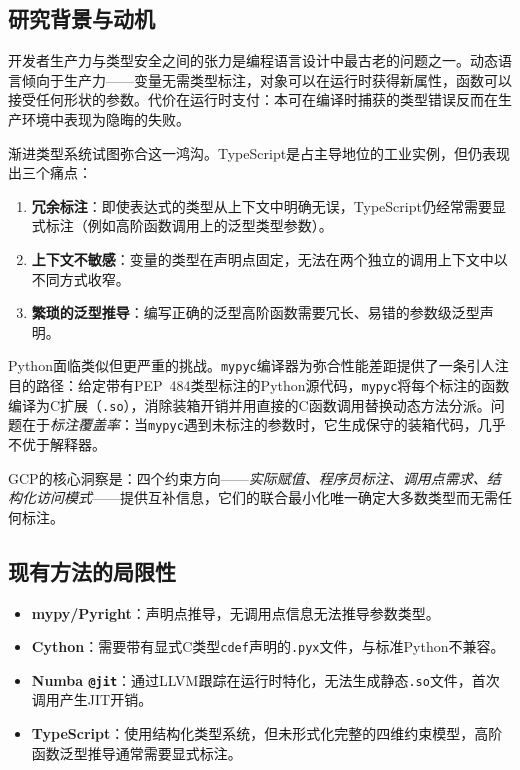 \documentclass[UTF8]{article}
\begin{document}
\subsection{研究背景与动机}

开发者生产力与类型安全之间的张力是编程语言设计中最古老的问题之一。动态语言倾向于生产力——变量无需类型标注，对象可以在运行时获得新属性，函数可以接受任何形状的参数。代价在运行时支付：本可在编译时捕获的类型错误反而在生产环境中表现为隐晦的失败。

渐进类型系统试图弥合这一鸿沟。TypeScript是占主导地位的工业实例，但仍表现出三个痛点：
\begin{enumerate}[leftmargin=2em]
\item \textbf{冗余标注}：即使表达式的类型从上下文中明确无误，TypeScript仍经常需要显式标注（例如高阶函数调用上的泛型类型参数）。
\item \textbf{上下文不敏感}：变量的类型在声明点固定，无法在两个独立的调用上下文中以不同方式收窄。
\item \textbf{繁琐的泛型推导}：编写正确的泛型高阶函数需要冗长、易错的参数级泛型声明。
\end{enumerate}

Python面临类似但更严重的挑战。\texttt{mypyc}编译器为弥合性能差距提供了一条引人注目的路径：给定带有PEP~484类型标注的Python源代码，\texttt{mypyc}将每个标注的函数编译为C扩展（\texttt{.so}），消除装箱开销并用直接的C函数调用替换动态方法分派。问题在于\emph{标注覆盖率}：当\texttt{mypyc}遇到未标注的参数时，它生成保守的装箱代码，几乎不优于解释器。

GCP的核心洞察是：四个约束方向——\emph{实际赋值、程序员标注、调用点需求、结构化访问模式}——提供互补信息，它们的联合最小化唯一确定大多数类型而无需任何标注。

\subsection{现有方法的局限性}

\begin{itemize}[leftmargin=2em]
\item \textbf{mypy/Pyright}：声明点推导，无调用点信息无法推导参数类型。
\item \textbf{Cython}：需要带有显式C类型\texttt{cdef}声明的\texttt{.pyx}文件，与标准Python不兼容。
\item \textbf{Numba \texttt{@jit}}：通过LLVM跟踪在运行时特化，无法生成静态\texttt{.so}文件，首次调用产生JIT开销。
\item \textbf{TypeScript}：使用结构化类型系统，但未形式化完整的四维约束模型，高阶函数泛型推导通常需要显式标注。
\end{itemize}
\end{document}
